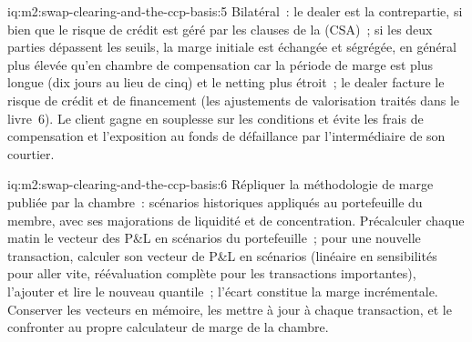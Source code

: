 \begin{solution}{iq:m2:swap-clearing-and-the-ccp-basis:5}
Bilatéral~: le dealer est la contrepartie, si bien que le risque de crédit est géré par les clauses de la
 (CSA)~; si les deux parties dépassent les seuils, la marge initiale est échangée
et ségrégée, en général plus élevée qu'en chambre de compensation car la période de marge est plus longue
(dix jours au lieu de cinq) et le netting plus étroit~; le dealer facture le risque de crédit et de
financement (les ajustements de valorisation traités dans le livre~6). Le client gagne
en souplesse sur les conditions et évite les frais de compensation et l'exposition au fonds de défaillance
par l'intermédiaire de son courtier.
\end{solution}

\begin{solution}{iq:m2:swap-clearing-and-the-ccp-basis:6}
Répliquer la méthodologie de marge publiée par la chambre~: scénarios historiques
appliqués au portefeuille du membre, avec ses majorations de liquidité et de concentration.
Précalculer chaque matin le vecteur des P\&L en scénarios du portefeuille~; pour une nouvelle
transaction, calculer son vecteur de P\&L en scénarios (linéaire en sensibilités pour aller vite, réévaluation complète
pour les transactions importantes), l'ajouter et lire le nouveau quantile~; l'écart
constitue la marge incrémentale. Conserver les vecteurs en mémoire, les mettre à jour à chaque
transaction, et le confronter au propre calculateur de marge de la chambre.
\end{solution}
